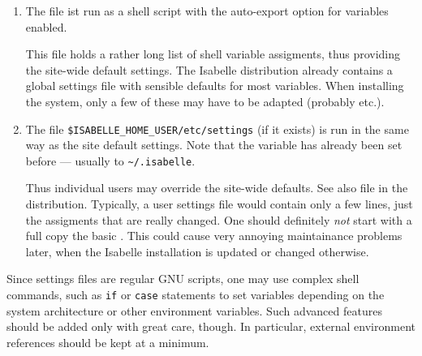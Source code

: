 \begin{isabellebody}
\begin{isamarkuptext}
\begin{enumerate}
  \item The file \hyperlink{file.$ISABELLE-HOME/etc/settings}{\mbox{}} ist run as a
  \hyperlink{executable.bash}{\mbox{}} shell script with the auto-export option for
  variables enabled.
  
  This file holds a rather long list of shell variable assigments,
  thus providing the site-wide default settings.  The Isabelle
  distribution already contains a global settings file with sensible
  defaults for most variables.  When installing the system, only a few
  of these may have to be adapted (probably \hyperlink{setting.ML-SYSTEM}{\mbox{}}
  etc.).
  
  \item The file \verb|$ISABELLE_HOME_USER/etc/settings| (if it
  exists) is run in the same way as the site default settings. Note
  that the variable \hyperlink{setting.ISABELLE-HOME-USER}{\mbox{}} has already been set
  before --- usually to \verb|~/.isabelle|.
  
  Thus individual users may override the site-wide defaults.  See also
  file \hyperlink{file.$ISABELLE-HOME/etc/user-settings.sample}{\mbox{}} in the
  distribution.  Typically, a user settings file would contain only a
  few lines, just the assigments that are really changed.  One should
  definitely \emph{not} start with a full copy the basic \hyperlink{file.$ISABELLE-HOME/etc/settings}{\mbox{}}. This could cause very annoying
  maintainance problems later, when the Isabelle installation is
  updated or changed otherwise.
  
  \end{enumerate}

  Since settings files are regular GNU \hypertarget{executable.bash}{\hyperlink{executable.bash}{\mbox{}}} scripts,
  one may use complex shell commands, such as \verb|if| or
  \verb|case| statements to set variables depending on the
  system architecture or other environment variables.  Such advanced
  features should be added only with great care, though. In
  particular, external environment references should be kept at a
  minimum.


\end{isamarkuptext}
\end{isabellebody}
